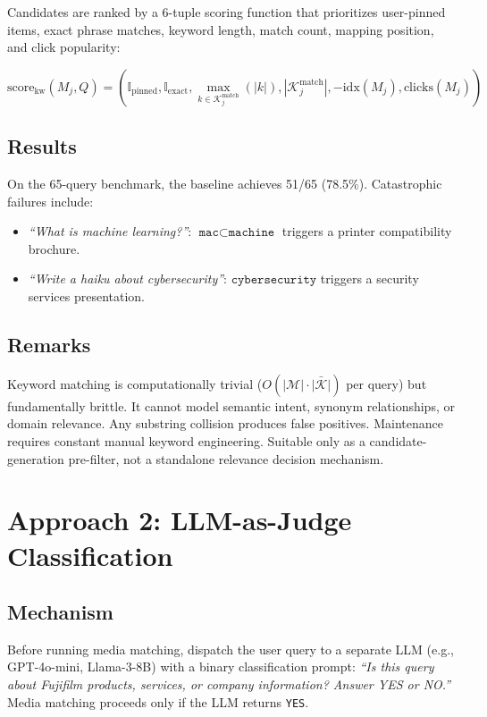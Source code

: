 \documentclass{article}
\begin{document}
Candidates are ranked by a 6-tuple scoring function that prioritizes user-pinned items, exact phrase matches, keyword length, match count, mapping position, and click popularity:

\begin{equation}
\text{score}_{\text{kw}}(M_j, Q) = (\mathbb{I}_{\text{pinned}}, \mathbb{I}_{\text{exact}}, \max_{k \in \mathcal{K}_j^{\text{match}}}(|k|), |\mathcal{K}_j^{\text{match}}|, -\text{idx}(M_j), \text{clicks}(M_j))
\end{equation}

\subsection{Results}
On the 65-query benchmark, the baseline achieves 51/65 (78.5\%). Catastrophic failures include:
\begin{itemize}
  \item \textit{``What is machine learning?''}: $\texttt{mac} \subset \texttt{machine}$ triggers a printer compatibility brochure.
  \item \textit{``Write a haiku about cybersecurity''}: $\texttt{cybersecurity}$ triggers a security services presentation.
\end{itemize}

\subsection{Remarks}
Keyword matching is computationally trivial ($O(|\mathcal{M}| \cdot \bar{|\mathcal{K}|})$ per query) but fundamentally brittle. It cannot model semantic intent, synonym relationships, or domain relevance. Any substring collision produces false positives. Maintenance requires constant manual keyword engineering. Suitable only as a candidate-generation pre-filter, not a standalone relevance decision mechanism.

\section{Approach 2: LLM-as-Judge Classification}

\subsection{Mechanism}
Before running media matching, dispatch the user query to a separate LLM (e.g., GPT-4o-mini, Llama-3-8B) with a binary classification prompt: \textit{``Is this query about Fujifilm products, services, or company information? Answer YES or NO.''} Media matching proceeds only if the LLM returns \texttt{YES}.
\end{document}
